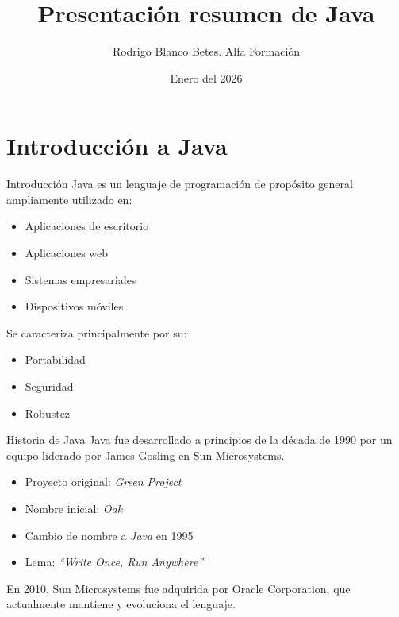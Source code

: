 \documentclass{beamer}
\title{Presentación resumen de Java}
\author{Rodrigo Blanco Betes. Alfa Formación}
\date{Enero del 2026}
\begin{document}
\begin{frame}
\titlepage
\end{frame}

\begin{frame}
\tableofcontents
\end{frame}



\section{Introducción a Java}
\begin{frame}{Introducción}
Java es un lenguaje de programación de propósito general ampliamente utilizado en:
\begin{itemize}
    \item Aplicaciones de escritorio
    \item Aplicaciones web
    \item Sistemas empresariales
    \item Dispositivos móviles
\end{itemize}

Se caracteriza principalmente por su:
\begin{itemize}
    \item Portabilidad
    \item Seguridad
    \item Robustez
\end{itemize}
\end{frame}

\begin{frame}{Historia de Java}
Java fue desarrollado a principios de la década de 1990 por un equipo liderado por James Gosling en Sun Microsystems.

\begin{itemize}
    \item Proyecto original: \textit{Green Project}
    \item Nombre inicial: \textit{Oak}
    \item Cambio de nombre a \textit{Java} en 1995
    \item Lema: \textit{``Write Once, Run Anywhere''}
\end{itemize}

En 2010, Sun Microsystems fue adquirida por Oracle Corporation, que actualmente mantiene y evoluciona el lenguaje.
\end{frame}
\end{document}
